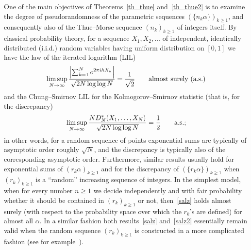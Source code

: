 \documentclass[12pt]{amsart}
\begin{document}
One of the main objectives of Theorems~\ref{th_thue} and~\ref{th_thue2} is to examine the degree of pseudorandomness of the parametric sequences $(\{n_k \alpha\})_{k \geq 1}$, and consequently also of the Thue--Morse sequence $(n_k)_{k \geq 1}$ of integers itself. By classical probability theory, for a sequence $X_1, X_2, \dots$ of independent, identically distributed (i.i.d.) random variables having uniform distribution on $[0,1]$ we have the law of the iterated logarithm (LIL)
\begin{equation} \label{salz}
\limsup_{N \to \infty} \frac{\left| \sum_{k=1}^N e^{2 \pi i h X_k} \right|}{\sqrt{2 N \log \log N}} = \frac{1}{\sqrt{2}} \qquad \textup{almost surely (a.s.)}
\end{equation}
and the Chung--Smirnov LIL for the Kolmogorov--Smirnov statistic (that is, for the discrepancy)
\begin{equation} \label{salz2}
\limsup_{N \to \infty} \frac{N D_N^*(X_1, \dots, X_N)}{\sqrt{2 N \log \log N}} = \frac{1}{2} \qquad \textup{a.s.};
\end{equation}
in other words, for a random sequence of points exponential sums are typically of asymptotic order roughly $\sqrt{N}$, and the discrepancy is typically also of the corresponding asymptotic order. Furthermore, similar results usually hold for exponential sums of $(r_k \alpha)_{k \geq 1}$ and for the discrepancy of $(\{r_k \alpha\})_{k \geq 1}$ when $(r_k)_{k \geq 1}$ is a ``random'' increasing sequence of integers. In the simplest model, when for every number $n \geq 1$ we decide independently and with fair probability whether it should be contained in $(r_k)_{k \geq 1}$ or not, then~\eqref{salz} holds almost surely (with respect to the probability space over which the $r_k$'s are defined) for almost all $\alpha$. In a similar fashion both results~\eqref{salz} and~\eqref{salz2} essentially remain valid when the random sequence $(r_k)_{k \geq 1}$ is constructed in a more complicated fashion (see for example~\cite{fu1,fu2,ras}).\\
\end{document}
